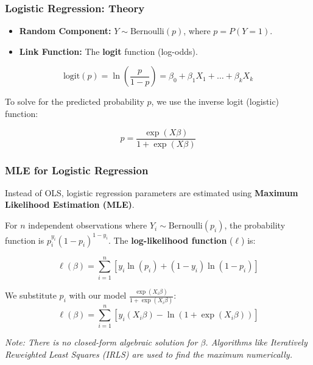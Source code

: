 \documentclass[10pt]{beamer} %
\begin{document}
\begin{frame}
    \frametitle{Logistic Regression: Theory}
    \begin{itemize}
        \item \textbf{Random Component:} $Y \sim \text{Bernoulli}(p)$, where $p = P(Y=1)$.
        \item \textbf{Link Function:} The \textbf{logit} function (log-odds).
    \end{itemize}
    
    \begin{equation*}
        \text{logit}(p) = \ln\left(\frac{p}{1-p}\right) = \beta_0 + \beta_1 X_1 + \dots + \beta_k X_k
    \end{equation*}
    
    \vspace{0.3cm}
    To solve for the predicted probability $p$, we use the inverse logit (logistic) function:
    
    \begin{equation*}
        p = \frac{\exp(X\beta)}{1 + \exp(X\beta)}
    \end{equation*}
\end{frame}

\begin{frame}
    \frametitle{MLE for Logistic Regression}
    Instead of OLS, logistic regression parameters are estimated using \textbf{Maximum Likelihood Estimation (MLE)}. 
    
    \vspace{0.3cm}
    For $n$ independent observations where $Y_i \sim \text{Bernoulli}(p_i)$, the probability function is $p_i^{y_i}(1-p_i)^{1-y_i}$. The \textbf{log-likelihood function} ($\ell$) is:
    
    \begin{equation*}
        \ell(\beta) = \sum_{i=1}^{n} \left[ y_i \ln(p_i) + (1 - y_i) \ln(1 - p_i) \right]
    \end{equation*}
    
    \vspace{0.2cm}
    We substitute $p_i$ with our model $\frac{\exp(X_i\beta)}{1 + \exp(X_i\beta)}$:
    \begin{equation*}
        \ell(\beta) = \sum_{i=1}^{n} \left[ y_i (X_i\beta) - \ln(1 + \exp(X_i\beta)) \right]
    \end{equation*}
    
    \textit{Note: There is no closed-form algebraic solution for $\beta$. Algorithms like Iteratively Reweighted Least Squares (IRLS) are used to find the maximum numerically.}
\end{frame}
\end{document}
